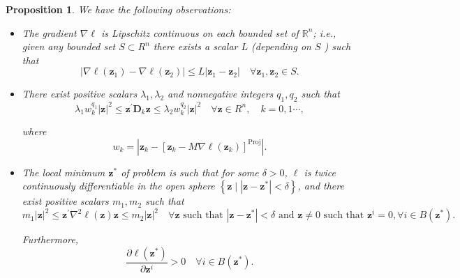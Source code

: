 \documentclass{article}
\theoremstyle{plain}
\newtheorem{proposition}[theorem]{Proposition}
\theoremstyle{definition}
\def \D {\mathbf{D}}
\def \z {\mathbf{z}}
\begin{document}
\begin{proposition}
    We have the following observations:
        \begin{itemize}
        \item[1] The gradient $\nabla \ell$ is Lipschitz continuous on each bounded set of $\mathbb{R}^n$; i.e., given any bounded set $S \subset R^n$ there exists a scalar $L$ (depending on $S$ ) such that
\begin{equation}
\label{Eq:smooth}
    |\nabla \ell(\z_1)-\nabla \ell(\z_2)| \leq L|\z_1-\z_2| \quad \forall \z_1, \z_2 \in S .
\end{equation}
        \item[2]  There exist positive scalars $\lambda_1, \lambda_2$ and nonnegative integers $q_1, q_2$ such that
\begin{equation}
\label{Eq:bounded}
    \lambda_1 w_k^{q_1}|\z|^2 \leq \z^{\prime} \D_k \z \leq \lambda_2 w_k^{q_2}|\z|^2 \quad \forall \z \in R^n, \quad k=0,1 \cdots,
\end{equation}

where
\[
w_k=\left|\z_k-\left[\z_k-M \nabla \ell\left(\z_k\right)\right]^{\operatorname{Proj}}\right| .
\]

\item[3]  The local minimum \(\z^*\) of problem is such that for some \(\delta > 0\), \(\ell\) is twice continuously differentiable in the open sphere \(\left\{\z \mid \left|\z - \z^*\right| < \delta\right\}\), and there exist positive scalars \(m_1, m_2\) such that
\[
m_1|\z|^2 \leq \z^{\prime} \nabla^2 \ell(\z) \z \leq m_2|\z|^2 \quad
\forall \z \text{ such that } \left|\z - \z^*\right| < \delta \text{ and } \z \neq 0 \text{ such that } \z^i = 0, \forall i \in B\left(\z^*\right).
\]

Furthermore,
\begin{equation}
\label{Eq:ball}
    \frac{\partial \ell\left(\z^*\right)}{\partial \z^i} > 0 \quad \forall i \in B\left(\z^*\right).
\end{equation}

    \end{itemize}
\end{proposition}
\end{document}
